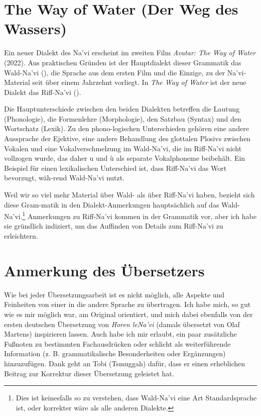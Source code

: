 \section{The Way of Water (Der Weg des Wassers)}
Ein neuer Dialekt des Na'vi erscheint im zweiten Film \textit{Avatar: The Way of Water} (2022). Aus praktischen Gründen ist der Hauptdialekt dieser Grammatik das Wald-Na'vi (), die Sprache aus dem ersten Film und die Einzige, zu der Na'vi-Material seit über einem Jahrzehnt vorliegt. In \textit{The Way of Water} ist der neue Dialekt das Riff-Na'vi ().

Die Hauptunterschiede zwischen den beiden Dialekten betreffen die Lautung (Phonologie), die Formenlehre (Morphologie), den Satzbau (Syntax) und den Wortschatz (Lexik). Zu den phono-logischen Unterschieden gehören eine andere Aussprache der Ejektive, eine andere Behandlung des glottalen Plosivs zwischen Vokalen und eine Vokalverschmelzung im Wald-Na'vi, die im Riff-Na'vi nicht vollzogen wurde, das daher u und ù als separate Vokalphoneme beibehält. Ein Beispiel für einen lexikalischen Unterschied ist, dass Riff-Na'vi das Wort   bevorzugt, wäh-rend Wald-Na'vi  nutzt.

Weil wir so viel mehr Material über Wald- als über Riff-Na'vi haben, bezieht sich diese Gram-matik in den Dialekt-Anmerkungen hauptsächlich auf das Wald-Na'vi.\footnote{Dies ist keinesfalls so zu verstehen, dass Wald-Na'vi eine Art Standardsprache ist, oder korrekter wäre als alle anderen Dialekte.} Anmerkungen zu Riff-Na'vi kommen in der Grammatik vor, aber ich habe sie gründlich indiziert, um das Auffinden von Details zum Riff-Na'vi zu erleichtern.

\section{Anmerkung des Übersetzers}
Wie bei jeder Übersetzungsarbeit ist es nicht möglich, alle Aspekte und Feinheiten von einer in die andere Sprache zu übertragen. Ich habe mich, so gut wie es mir möglich war, am Original orientiert, und mich dabei ebenfalls von der ersten deutschen Übersetzung von \textit{Horen leNa'vi} (damals übersetzt von Olaf Martens) inspirieren lassen. Auch habe ich mir erlaubt, ein paar zusätzliche Fußnoten zu bestimmten Fachausdrücken oder schlicht als weiterführende Information (z. B. grammatikalische Besonderheiten oder Ergänzungen) hinzuzufügen. Dank geht an Tobi (Tsmuggah) dafür, dass er einen erheblichen Beitrag zur Korrektur dieser Übersetzung geleistet hat.

